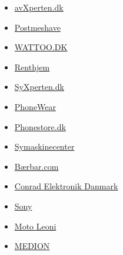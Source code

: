 \documentclass[10pt]{IEEEtran}
\begin{document}
\begin{enumerate}
\begin{itemize}
		\item \href{http://www.trustpilot.dk/review/www.avxperten.dk}{avXperten.dk}
		\item \href{http://www.trustpilot.dk/review/www.postmeshave.dk}{Postmeshave}
		\item \href{http://www.trustpilot.dk/review/www.wattoo.dk}{WATTOO.DK}
		\item \href{http://www.trustpilot.dk/review/www.renthjem.dk}{Renthjem}
		\item \href{http://www.trustpilot.dk/review/www.syxperten-webshop.dk}{SyXperten.dk}
		\item \href{http://www.trustpilot.dk/review/www.phonewear.dk}{PhoneWear}
		\item \href{http://www.trustpilot.dk/review/www.phonestore.dk}{Phonestore.dk}
		\item \href{http://www.trustpilot.dk/review/www.symaskinecenter.dk}{Symaskinecenter}
		\item \href{http://www.trustpilot.dk/review/www.notebookonline.dk}{Bærbar.com}
		\item \href{http://www.trustpilot.dk/review/www.conradelektronik.dk}{Conrad Elektronik Danmark}
		\item \href{http://www.trustpilot.dk/review/www.sony.dk}{Sony}
		\item \href{http://www.trustpilot.dk/review/www.moto-leoni.dk}{Moto Leoni}
		\item \href{http://www.trustpilot.dk/review/www.medion.com}{MEDION}
	\end{itemize}
\end{enumerate}
\end{document}
